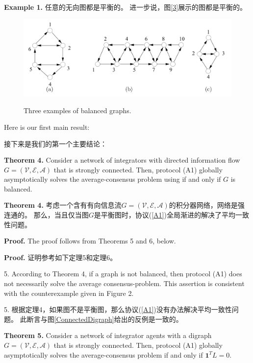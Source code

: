 \documentclass{article}
\begin{document}
\noindent \textbf{Example 1.} 任意的无向图都是平衡的。
进一步说，图\ref{3}展示的图都是平衡的。

\begin{figure}[htbp]
    \centering
    \includegraphics[width=12cm]{figures/Fig3-BalancedGraphs.jpeg}
    \label{BalancedGraphs}
    \caption{Three examples of balanced graphs.}
\end{figure}

{\color[gray]{0.5}
\noindent Here is our ﬁrst main result:
}

\noindent 接下来是我们的第一个主要结论：

{\color[gray]{0.5}
\noindent \textbf{Theorem 4.} Consider a network of integrators with directed information ﬂow $G=(\mathcal{V}, \mathcal{E}, \mathcal{A})$ that is strongly connected. 
Then, protocol (A1) globally asymptotically solves the average-consensus problem using if and only if $G$ is balanced.
}

\noindent \textbf{Theorem 4.} 考虑一个含有有向信息流$G=(\mathcal{V}, \mathcal{E}, \mathcal{A})$的积分器网络，网络是强连通的。
那么，当且仅当图$G$是平衡图时，协议(\ref{A1})全局渐进的解决了平均一致性问题。

{\color[gray]{0.5}
\noindent \textbf{Proof.} The proof follows from Theorems 5 and 6, below.
}

\noindent \textbf{Proof.} 证明参考如下定理5和定理6。

{\color[gray]{0.5}
 5. According to Theorem 4, if a graph is not balanced, then protocol (A1) does not necessarily solve the average consensus-problem. This assertion is consistent with the counterexample given in Figure 2.
}

 5. 根据定理4，如果图不是平衡图，那么协议(\ref{A1})没有办法解决平均一致性问题。
此断言与图\ref{ConnectedDigraph}给出的反例是一致的。

{\color[gray]{0.5}
\noindent \textbf{Theorem 5.} Consider a network of integrator agents with a digraph $G=(\mathcal{V}, \mathcal{E}, \mathcal{A})$ that is strongly connected. 
Then, protocol (A1) globally asymptotically solves the average-consensus problem if and only if $\mathbf{1}^TL=0$.
}
\end{document}
